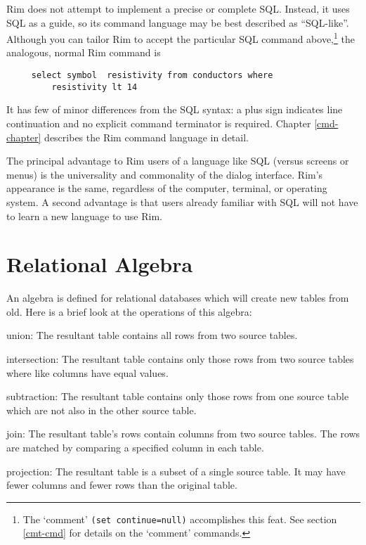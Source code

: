 \documentclass[11pt,a4paper]{report}
\def\I{\index}
\begin{document}
 
Rim does not attempt to implement a precise or complete SQL.
Instead, it uses SQL as a guide, so its command language
may be best described as ``SQL-like''.
Although you can tailor Rim to accept the particular
SQL command above,\footnote{The `comment' {\tt  *(set continue=null)}
 \I{comments}
 accomplishes this feat. See section \ref{cmt-cmd}
 for details on the `comment' commands.}
 the analogous, normal Rim command is
 
\begin{verbatim}
     select symbol  resistivity from conductors where
         resistivity lt 14
\end{verbatim}
 
\noindent
It has few of minor differences from the SQL syntax:
a plus sign
indicates line continuation and no explicit command terminator is required.
Chapter \ref{cmd-chapter} describes the Rim command language
in detail.
 
\I{SQL}
The principal advantage to Rim users of a language like SQL
(versus screens or menus) is the universality
and commonality of the dialog interface.  Rim's appearance
is the same, regardless of the computer, terminal, or operating
system.
A second advantage is that users already familiar with
SQL will not have to learn a new language to use Rim.
 
\section{Relational Algebra}
\I{algebra} \I{relational database}
An algebra is defined for relational databases which will
create new tables from old.  Here is a brief look
at the operations of this algebra:
 
\begin{List}
\item[union:] The resultant table contains all rows from
  two source tables.
 
\item[intersection:] The resultant table contains only  those rows from
  two source tables where like columns have equal values.
 
\item[subtraction:] The resultant table contains only those rows from
  one source table which are not also in the other source table.
 
\item[join:] The resultant table's rows contain columns from
  two source tables.  The rows are matched by comparing a specified
  column in each table.
 
\item[projection:] The resultant table is a subset of a single
  source table.  It may have fewer columns and fewer rows
  than the original table.
 
\end{List}
 
\end{document}
